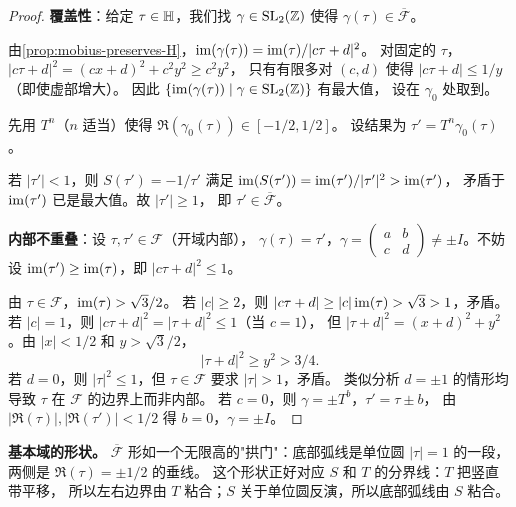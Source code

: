 \begin{proof}
\textbf{覆盖性}：给定 $\tau \in \mathbb{H}$，我们找 $\gamma \in \mathrm{SL}_2(\mathbb{Z})$
使得 $\gamma(\tau) \in \overline{\mathcal{F}}$。

由\cref{prop:mobius-preserves-H}，$\operatorname{im}(\gamma(\tau)) = \operatorname{im}(\tau)/|c\tau + d|^2$。
对固定的 $\tau$，$|c\tau + d|^2 = (cx + d)^2 + c^2 y^2 \geq c^2 y^2$，
只有有限多对 $(c,d)$ 使得 $|c\tau + d| \leq 1/y$（即使虚部增大）。
因此 $\{\operatorname{im}(\gamma(\tau)) \mid \gamma \in \mathrm{SL}_2(\mathbb{Z})\}$ 有最大值，
设在 $\gamma_0$ 处取到。

先用 $T^n$（$n$ 适当）使得 $\Re(\gamma_0(\tau)) \in [-1/2, 1/2]$。
设结果为 $\tau' = T^n \gamma_0(\tau)$。

若 $|\tau'| < 1$，则 $S(\tau') = -1/\tau'$ 满足
$\operatorname{im}(S(\tau')) = \operatorname{im}(\tau')/|\tau'|^2 > \operatorname{im}(\tau')$，
矛盾于 $\operatorname{im}(\tau')$ 已是最大值。故 $|\tau'| \geq 1$，
即 $\tau' \in \overline{\mathcal{F}}$。

\textbf{内部不重叠}：设 $\tau, \tau' \in \mathcal{F}$（开域内部），
$\gamma(\tau) = \tau'$，$\gamma = \begin{pmatrix} a & b \\ c & d \end{pmatrix}
\neq \pm I$。不妨设 $\operatorname{im}(\tau') \geq \operatorname{im}(\tau)$，即
$|c\tau + d|^2 \leq 1$。

由 $\tau \in \mathcal{F}$，$\operatorname{im}(\tau) > \sqrt{3}/2$。
若 $|c| \geq 2$，则 $|c\tau + d| \geq |c|\operatorname{im}(\tau) > \sqrt{3} > 1$，矛盾。
若 $|c| = 1$，则 $|c\tau + d|^2 = |\tau + d|^2 \leq 1$（当 $c = 1$），
但 $|\tau + d|^2 = (x + d)^2 + y^2$。由 $|x| < 1/2$ 和 $y > \sqrt{3}/2$，
\[
  |\tau + d|^2 \geq y^2 > 3/4.
\]
若 $d = 0$，则 $|\tau|^2 \leq 1$，但 $\tau \in \mathcal{F}$ 要求
$|\tau| > 1$，矛盾。
类似分析 $d = \pm 1$ 的情形均导致 $\tau$ 在 $\mathcal{F}$ 的边界上而非内部。
若 $c = 0$，则 $\gamma = \pm T^b$，$\tau' = \tau \pm b$，
由 $|\Re(\tau)|, |\Re(\tau')| < 1/2$ 得 $b = 0$，$\gamma = \pm I$。
\end{proof}

\textbf{基本域的形状。}
$\overline{\mathcal{F}}$ 形如一个无限高的"拱门"：底部弧线是单位圆
$|\tau| = 1$ 的一段，两侧是 $\Re(\tau) = \pm 1/2$ 的垂线。
这个形状正好对应 $S$ 和 $T$ 的分界线：$T$ 把竖直带平移，
所以左右边界由 $T$ 粘合；$S$ 关于单位圆反演，所以底部弧线由 $S$ 粘合。

